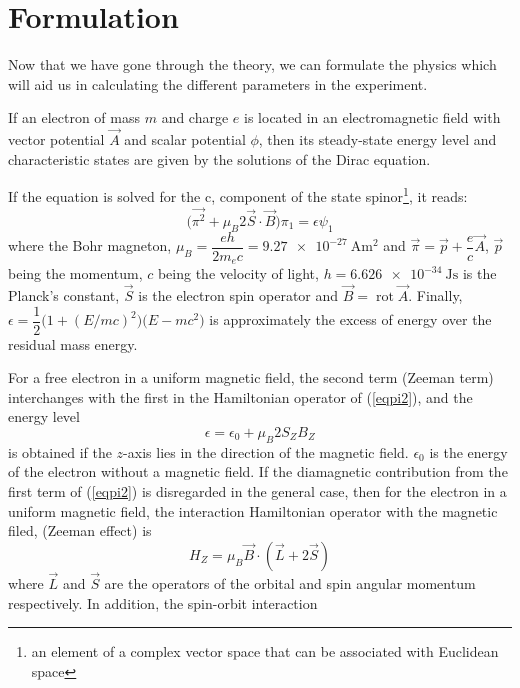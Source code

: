 \documentclass[%
 reprint,
nofootinbib,
 amsmath,amssymb,
 aps,
floatfix,
]{revtex4-2}
\DeclareMathOperator{\Rot}{rot}
\begin{document}
\section{Formulation}
    Now that we have gone through the theory, we can formulate the physics which will aid us in calculating the different parameters in the experiment.
    \par
    If an electron of mass $m$ and charge $e$ is located in an electromagnetic field with vector potential $\Vec{A}$ and scalar potential $\phi$, then its steady-state energy level and characteristic states are given by the solutions of the Dirac equation.
    \par
    If the equation is solved for the c, component of the state spinor\footnote{an element of a complex vector space that can be associated with Euclidean space}, it reads:
    \begin{equation}
    \label{eqpi2}
        \Big( \Vec{\pi^{2}} + \mu_B 2 \Vec{S} \cdot \Vec{B} \Big) \pi_1 = \epsilon \psi_1
    \end{equation}
    where the Bohr magneton, $\mu_B = \dfrac{eh}{2 m_e c} = \SI{9.27e-27}{\ampere \metre \squared}$ and $\Vec{\pi} = \Vec{p} + \dfrac{e}{c} \Vec{A}$, $\Vec{p}$ being the momentum, $c$ being the velocity of light, $h = \SI{6.626e-34}{\joule \second}$ is the Planck's constant, $\Vec{S}$ is the electron spin operator and $\Vec{B} = \Rot \Vec{A}$. Finally, $\epsilon = \dfrac{1}{2} \Big( 1 + (E/mc)^2 \Big) \Big( E - mc^2\Big)$ is approximately the excess of energy over the residual mass energy.
    \par
    For a free electron in a uniform magnetic field, the second term (Zeeman term) interchanges with the first in the Hamiltonian operator of (\ref{eqpi2}), and the energy level
    \begin{equation}
        \epsilon = \epsilon_0 + \mu_B 2 S_Z B_Z
    \end{equation}
    is obtained if the $z$-axis lies in the direction of the magnetic field. $\epsilon_0$ is the energy of the electron without a magnetic field. If the diamagnetic contribution from the first term of (\ref{eqpi2}) is disregarded in the general case, then for the electron in a uniform magnetic field, the interaction Hamiltonian operator with the magnetic filed, (Zeeman effect) is
    \begin{equation}
        H_Z = \mu_B \Vec{B} \cdot (\Vec{L} + 2 \Vec{S})
    \end{equation}
    where $\Vec{L}$ and $\Vec{S}$ are the operators of the orbital and spin angular momentum respectively. In addition, the spin-orbit interaction
\end{document}
